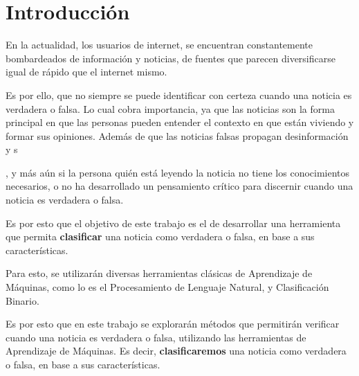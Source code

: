 \section{Introducción}
{

En la actualidad, los usuarios de internet, se encuentran constantemente bombardeados de información y noticias, de fuentes que parecen diversificarse igual de rápido que el internet mismo. 

Es por ello, que no siempre se puede identificar con certeza cuando una noticia es verdadera o falsa. Lo cual cobra importancia, ya que las noticias son la forma principal en que las personas pueden entender el contexto en que están viviendo y formar sus opiniones. Además de que las noticias falsas propagan desinformación y s

, y más aún si la persona quién está leyendo la noticia no tiene los conocimientos necesarios, o no ha desarrollado un pensamiento crítico para discernir cuando una noticia es verdadera o falsa.

Es por esto que el objetivo de este trabajo es el de desarrollar una herramienta que permita \textbf{clasificar} una noticia como verdadera o falsa, en base a sus características.

Para esto, se utilizarán diversas herramientas clásicas de Aprendizaje de Máquinas, como lo es el Procesamiento de Lenguaje Natural, y Clasificación Binario.   


Es por esto que en este trabajo se explorarán métodos que permitirán verificar cuando una noticia es verdadera o falsa, utilizando las
herramientas de Aprendizaje de Máquinas. Es decir, \textbf{clasificaremos} una noticia como verdadera o falsa, en base a sus características.


}

